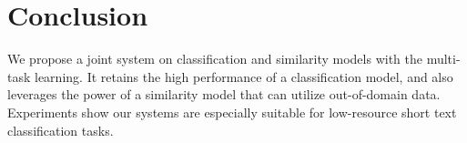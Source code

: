 \section{Conclusion}
\label{sec:conclusion}

We propose a joint system on classification and  similarity  models with the multi-task learning.
It retains the high performance of a classification model, and also leverages the power of a similarity model that can utilize out-of-domain data.
Experiments show our systems are  especially suitable for  low-resource  short text  classification  tasks.
